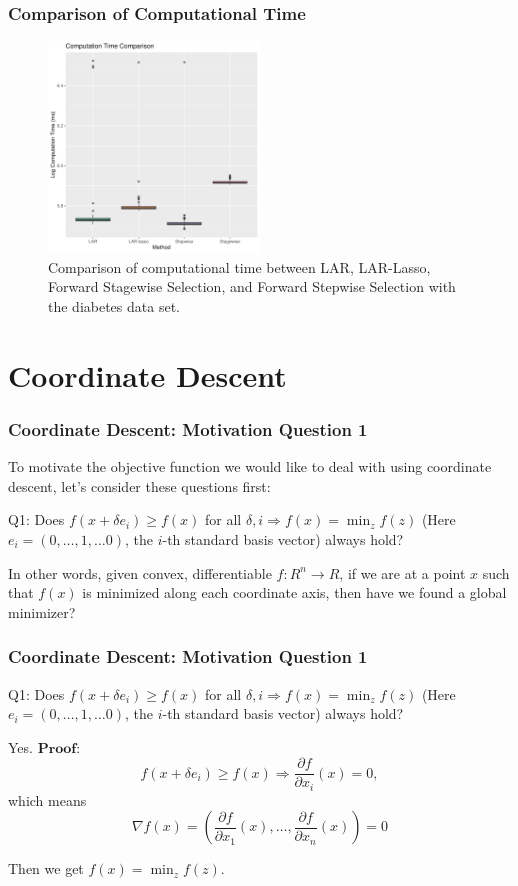 \begin{frame}
    \frametitle{Comparison of Computational Time}
\begin{figure}[!htbp]
    \begin{center}
        \includegraphics[width=0.5\textwidth]{img/lars_time.pdf}
    \end{center}
    \caption{Comparison of computational time between LAR, LAR-Lasso, Forward Stagewise Selection, and Forward Stepwise Selection with the diabetes data set.}\label{fig:lars_time}
\end{figure}
\end{frame}

\section{Coordinate Descent}
\begin{frame}
    \frametitle{Coordinate Descent: Motivation Question 1}
To motivate the objective function we would like to deal with using coordinate descent, let's consider these questions first:

Q1: Does $f\left(x+\delta e_i\right) \geq f(x)$ for all $\delta, i \Rightarrow f(x)=\min _z f(z)$ (Here $e_i=(0, \ldots, 1, \ldots 0)$, the $i$-th standard basis vector) always hold?

In other words, given convex, differentiable $f: R^n \rightarrow R$, if we are at a point $x$ such that $f(x)$ is minimized along each coordinate axis, then have we found a global minimizer?
\end{frame}

\begin{frame}
    \frametitle{Coordinate Descent: Motivation Question 1}
Q1: Does $f\left(x+\delta e_i\right) \geq f(x)$ for all $\delta, i \Rightarrow f(x)=\min _z f(z)$ (Here $e_i=(0, \ldots, 1, \ldots 0)$, the $i$-th standard basis vector) always hold?

Yes. $\textbf{Proof}$:
$$
f\left(x+\delta e_i\right) \geq f(x) \Rightarrow \frac{\partial f}{\partial x_i}(x)=0,
$$
which means
$$
\nabla f(x)=\left(\frac{\partial f}{\partial x_1}(x), \ldots, \frac{\partial f}{\partial x_n}(x)\right)=0
$$

Then we get $f(x)=\min_z f(z)$.
\end{frame}

